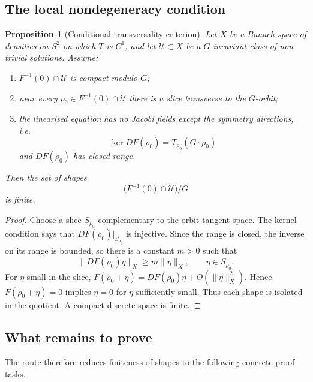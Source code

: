 \documentclass[12pt]{article}
\newtheorem{proposition}[theorem]{Proposition}
\begin{document}
\subsection{The local nondegeneracy condition}

\begin{proposition}[Conditional transversality criterion]
  Let $X$ be a Banach space of densities on $S^2$ on which $T$ is $C^1$, and
  let $\mathcal U \subset X$ be a $G$-invariant class of non-trivial solutions.
  Assume:
  \begin{enumerate}[leftmargin=2em]
    \item $F^{-1}(0)\cap\mathcal U$ is compact modulo $G$;
    \item near every $\rho_0\in F^{-1}(0)\cap\mathcal U$ there is a slice
      transverse to the $G$-orbit;
    \item the linearised equation has no Jacobi fields except the symmetry
      directions, i.e.
      \[
        \ker DF(\rho_0)=T_{\rho_0}(G\cdot\rho_0)
      \]
      and $DF(\rho_0)$ has closed range.
  \end{enumerate}
  Then the set of shapes
  \[
    \bigl(F^{-1}(0)\cap\mathcal U\bigr)/G
  \]
  is finite.
\end{proposition}

\begin{proof}
  Choose a slice $S_{\rho_0}$ complementary to the orbit tangent space. The
  kernel condition says that $DF(\rho_0)|_{S_{\rho_0}}$ is injective. Since the
  range is closed, the inverse on its range is bounded, so there is a constant
  $m>0$ such that
  \[
    \|DF(\rho_0)\eta\|_X \geq m\|\eta\|_X,\qquad \eta\in S_{\rho_0}.
  \]
  For $\eta$ small in the slice,
  $F(\rho_0+\eta)=DF(\rho_0)\eta+O(\|\eta\|_X^2)$. Hence
  $F(\rho_0+\eta)=0$ implies $\eta=0$ for $\eta$ sufficiently small. Thus each
  shape is isolated in the quotient. A compact discrete space is finite.
\end{proof}

\subsection{What remains to prove}

The route therefore reduces finiteness of shapes to the following concrete
proof tasks.
\end{document}
